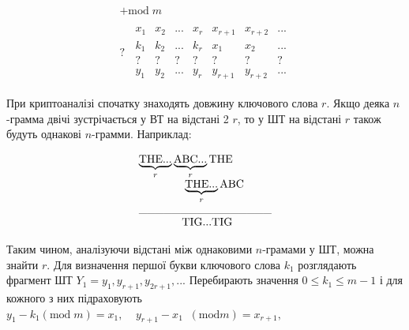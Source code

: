 \documentclass[a4paper]{article}
\newcounter{}
\newcommand\normalsubformula[1]{\text{\mathversion{normal}$#1$}}
\begin{document}
\bigskip

\begin{equation*}
{\begin{matrix}+\text{mod}\;m\\\\?\;\;\begin{matrix}x_{{1}}&x_{{2}}&\text{.}\text{.}\text{.}&x_{{r}}&x_{{r+1}}&x_{{r+2}}&\text{.}\text{.}\text{.}\\k_{{1}}&k_{{2}}&\text{.}\text{.}\text{.}&k_{{r}}&x_{{1}}&x_{{2}}&\text{.}\text{.}\text{.}\\?&?&?&?&?&?&?\\y_{{1}}&y_{{2}}&\text{.}\text{.}\text{.}&y_{{r}}&y_{{r+1}}&y_{{r+2}}&\text{.}\text{.}\text{.}\end{matrix}\end{matrix}}
\end{equation*}

\bigskip

При криптоаналізі спочатку знаходять довжину ключового слова  ${r}$. Якщо деяка 
${n}${}-грамма двічі зустрічається у ВТ на відстані 2 ${r}$, то у ШТ на
відстані  ${r}$ також будуть однакові  ${n}${}-грамми. Наприклад:


\bigskip

\begin{equation*}
\begin{matrix}{\underbrace{\normalsubformula{\text{THE}}\text{.}\text{.}\text{.}}_{{r}}\underbrace{\normalsubformula{\text{ABC}}\text{.}\text{.}\text{.}}_{{r}}\normalsubformula{\text{THE}}}\hfill\null
\\\;\;\;\;\;\;\;\;\;\;\;\;\;\;\;\underbrace{\normalsubformula{\text{THE}}\text{.}\text{.}\text{.}}_{{r}}\normalsubformula{\text{ABC}}\hfill\null
\\\text{\_\_\_\_\_\_\_\_\_\_\_\_\_\_\_\_}\hfill\null
\\\;\;\;\;\;\;\;\;\;\;\;\;\;\;\normalsubformula{\text{TIG}}\text{.}\text{.}\text{.}\normalsubformula{\text{TIG}}\hfill\null
\end{matrix}\hfill 
\end{equation*}

\bigskip

Таким чином, аналізуючи відстані між однаковими  ${n}${}-грамами у ШТ, можна
знайти  ${r}$. Для визначення першої букви ключового слова  ${k_{{1}}}$
розглядають фрагмент ШТ 
${Y_{{1}}=y_{{1}},y_{{r+1}},y_{{2r+1}},\text{.}\text{.}\text{.}}$ Перебирають
значення  ${0\le k_{{1}}\le m-1}$ і для кожного з них підраховують 
${y_{{1}}-k_{{1}}(\text{mod}\;m)=x_{{1}},\;\;\;\;y_{{r+1}}-x_{{1}}\;\;(\text{mod}m)=x_{{r+1}},\;\;\;\;\;}$
\end{document}
